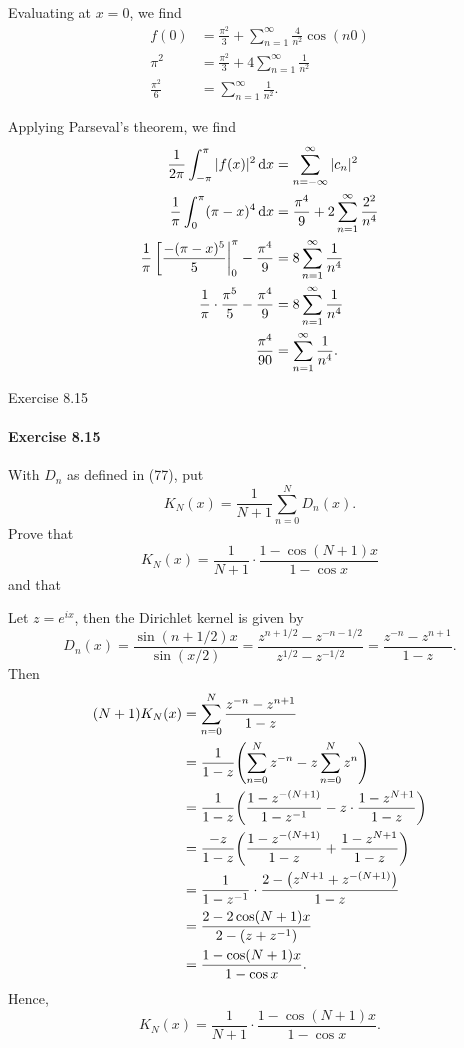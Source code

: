 \documentclass[12pt]{article}
\newenvironment{fullbox}{\begin{lrbox}{\savefullbox}\begin{minipage}{\dimexpr\textwidth-2\fboxsep\relax}}{\end{minipage}\end{lrbox}\begin{center}\framebox[\textwidth]{\usebox{\savefullbox}}\end{center}}
\newenvironment{pbox}[1][]{\begin{fullbox}\ifx#1\empty\else\paragraph{#1}\fi}{\end{fullbox}}
\theoremstyle{definition}
\begin{document}
Evaluating at $x = 0$, we find
\begin{align*}
    f(0) &= \frac{\pi^2}{3} + \sum_{n=1}^{\infty}\frac{4}{n^2}\cos(n0) \\
    \pi^2 &= \frac{\pi^2}{3} + 4\sum_{n=1}^{\infty}\frac{1}{n^2} \\
    \frac{\pi^2}{6} &= \sum_{n=1}^{\infty}\frac{1}{n^2}.
\end{align*}


Applying Parseval's theorem, we find
\begin{align*}
    \frac{1}{2\pi} \int_{-\pi}^{\pi} |f(x)|^2 \dd{x} &= \sum_{n=-\infty}^{\infty} |c_n|^2 \\
    \frac{1}{\pi} \int_{0}^{\pi} (\pi - x)^4 \dd{x} &= \frac{\pi^4}{9} + 2\sum_{n=1}^{\infty} \frac{2^2}{n^4} \\
    \frac{1}{\pi} \eval[\frac{-(\pi - x)^5}{5}|_{0}^{\pi} - \frac{\pi^4}{9} &= 8\sum_{n=1}^{\infty} \frac{1}{n^4} \\
    \frac{1}{\pi} \cdot \frac{\pi^5}{5} - \frac{\pi^4}{9} &= 8\sum_{n=1}^{\infty} \frac{1}{n^4} \\
    \frac{\pi^4}{90} &= \sum_{n=1}^{\infty} \frac{1}{n^4}.
\end{align*}





\newpage
\begin{pbox}[Exercise 8.15]
    With $D_n$ as defined in (77), put
    \[
        K_N(x) = \frac{1}{N + 1} \sum_{n=0}^{N} D_n(x).
    \]
    Prove that
    \[
        K_N(x) = \frac{1}{N + 1} \cdot \frac{1 - \cos(N + 1)x}{1 - \cos x}
    \]
    and that
\end{pbox}

Let $z = e^{ix}$, then the Dirichlet kernel is given by
\[
    D_n(x)
        = \frac{\sin(n + 1/2)x}{\sin(x/2)}
        = \frac{z^{n+1/2} - z^{-n - 1/2}}{z^{1/2} - z^{-1/2}}
        = \frac{z^{-n} - z^{n + 1}}{1 - z}.
\]
Then
\begin{align*}
    (N+1)K_N(x)
        &= \sum_{n=0}^{N} \frac{z^{-n} - z^{n + 1}}{1 - z} \\
        &= \frac{1}{1 - z} \qty(\sum_{n=0}^{N} z^{-n} - z\sum_{n=0}^{N} z^n) \\
        &= \frac{1}{1 - z} \qty(\frac{1 - z^{-(N + 1)}}{1 - z^{-1}} - z \cdot \frac{1 - z^{N + 1}}{1 - z}) \\
        &= \frac{-z}{1 - z} \qty(\frac{1 - z^{-(N + 1)}}{1 - z} + \frac{1 - z^{N + 1}}{1 - z}) \\
        &= \frac{1}{1 - z^{-1}} \cdot \frac{2 - \qty(z^{N+1} + z^{-(N+1)})}{1 - z} \\
        &= \frac{2 - 2\cos(N + 1)x}{2 - \qty(z + z^{-1})} \\
        &= \frac{1 - \cos(N + 1)x}{1 - \cos x}.
\end{align*}
Hence,
\[
    K_N(x) = \frac{1}{N + 1} \cdot \frac{1 - \cos(N + 1)x}{1 - \cos x}.
\]
\end{document}
